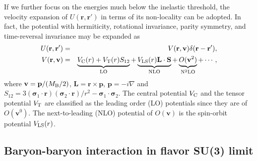   If we further focus on the 
  energies  much below  the inelastic threshold,
   the velocity expansion
   of $U(\mathbf{r},\mathbf{r}')$ in terms of its  non-locality can be adopted.
   In fact, the potential with hermiticity, 
   rotational invariance, parity symmetry,   and time-reversal invariance may be expanded as \cite{okubo}
\begin{eqnarray} 
\label{eq:U-del}
  U(\mathbf{r},\mathbf{r}')    &=& V(\mathbf{r}, \mathbf{v}) \delta(\mathbf{r}-\mathbf{r}'), \\
 V(\mathbf{r}, \mathbf{v})    & =&
   \underbrace{V_{\rm C}(r) + V_{\rm T}(r) S_{12}}_{\rm LO} 
  + \underbrace{V_{\rm LS}(r) {\mathbf{L}} \cdot {\mathbf{S}}}_{\rm NLO}  
  +\underbrace{{O}(\mathbf{v}^2)}_{{\rm N}^2{\rm LO}}
  + \cdots , 
   \label{eq:V-pot}
\end{eqnarray} 
   where $\mathbf{v} = \mathbf{p}/(M_{\rm B}/2) $, $\mathbf{L} = \mathbf{r} \times \mathbf{p} $, 
   $\mathbf{p} = -i \nabla$ and 
   $S_{12}=3(\mathbf{\sigma}_1 \cdot \mathbf{r})(\mathbf{\sigma}_2 \cdot \mathbf{r})/r^2 - \mathbf{\sigma}_1 \cdot \mathbf{\sigma}_2$.
     The central potential $V_{\rm C}$ and 
  the tensor potential $V_{\rm T}$ are classified as
  the leading order (LO) potentials since they
  are of $O(\mathbf{v}^0)$. The next-to-leading (NLO) potential of  
  $O(\mathbf{v})$ is the spin-orbit potential  $V_{\rm LS}(r)$. 

\subsection{Baryon-baryon interaction in flavor SU(3) limit}
  
